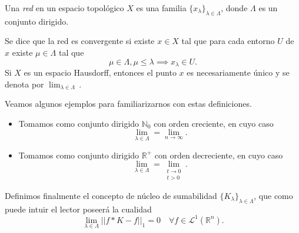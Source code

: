 \begin{definicion}
   Una \textit{red} en un espacio topológico $X$ es una familia $\{x_{\lambda}\}_{\lambda \in \Lambda}$, donde $\Lambda$ es un conjunto dirigido.
\end{definicion}

\noindent Se dice que la red es convergente si existe $x \in X$ tal que para cada entorno $U$ de $x$ existe $\mu \in \Lambda$ tal que 
\begin{equation}
    \mu \in \Lambda, \mu \leq \lambda \implies x_{\lambda} \in U.
\end{equation}
\noindent Si $X$ es un espacio Hausdorff, entonces el punto $x$ es necesariamente único y se denota por $\lim_{\lambda \in \Lambda} \,$.


\begin{ejemplo}
Veamos algunos ejemplos para familiarizarnos con estas definiciones.
\begin{itemize}
    \item Tomamos como conjunto dirigido $\mathbb{N}_0$ con orden creciente, en cuyo caso 
    \begin{equation}
    \lim_{\lambda \in \Lambda} =     \lim_{n \rightarrow \infty}.
    \end{equation}
    \item Tomamos como conjunto dirigido $\mathbb{R}^+$ con orden decreciente, en cuyo caso 
    \begin{equation}
    \lim_{\lambda \in \Lambda} 
 = \lim_{\substack{t \rightarrow 0 \\ t > 0}}.
    \end{equation}
\end{itemize}
    
\end{ejemplo}

\noindent Definimos finalmente el concepto de núcleo de sumabilidad $\{K_{\lambda}\}_{\lambda \in \Lambda}$, que como puede intuir el lector poseerá la cualidad 
\begin{equation}
    \lim_{\lambda \in \Lambda} ||f*K-f||_1=0 \quad  \forall f \in \mathscr{L}^1(\mathbb{R}^n).
\end{equation}


